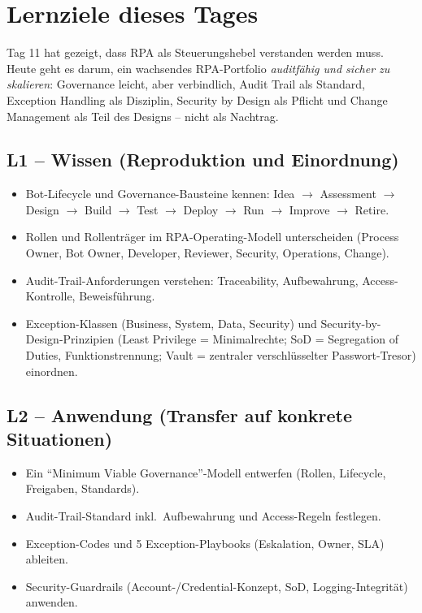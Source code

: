 \documentclass[11pt,a4paper,oneside]{article}
\begin{document}
\section*{Lernziele dieses Tages}
\thispagestyle{plain}

\noindent Tag 11 hat gezeigt, dass RPA als Steuerungshebel verstanden werden muss. Heute geht es darum, ein wachsendes RPA-Portfolio \emph{auditfähig und sicher zu skalieren}: Governance leicht, aber verbindlich, Audit Trail als Standard, Exception Handling als Disziplin, Security by Design als Pflicht und Change Management als Teil des Designs -- nicht als Nachtrag.

\subsection*{L1 -- Wissen (Reproduktion und Einordnung)}
\begin{itemize}
  \item Bot-Lifecycle und Governance-Bausteine kennen: Idea $\to$ Assessment $\to$ Design $\to$ Build $\to$ Test $\to$ Deploy $\to$ Run $\to$ Improve $\to$ Retire.
  \item Rollen und Rollenträger im RPA-Operating-Modell unterscheiden (Process Owner, Bot Owner, Developer, Reviewer, Security, Operations, Change).
  \item Audit-Trail-Anforderungen verstehen: Traceability, Aufbewahrung, Access-Kontrolle, Beweisführung.
  \item Exception-Klassen (Business, System, Data, Security) und Security-by-Design-Prinzipien (Least Privilege = Minimalrechte; SoD = Segregation of Duties, Funktionstrennung; Vault = zentraler verschl\"usselter Passwort-Tresor) einordnen.
\end{itemize}

\subsection*{L2 -- Anwendung (Transfer auf konkrete Situationen)}
\begin{itemize}
  \item Ein ``Minimum Viable Governance''-Modell entwerfen (Rollen, Lifecycle, Freigaben, Standards).
  \item Audit-Trail-Standard inkl.\ Aufbewahrung und Access-Regeln festlegen.
  \item Exception-Codes und 5 Exception-Playbooks (Eskalation, Owner, SLA) ableiten.
  \item Security-Guardrails (Account-/Credential-Konzept, SoD, Logging-Integrität) anwenden.
\end{itemize}
\end{document}
